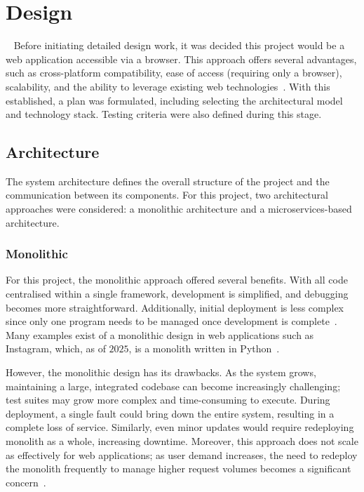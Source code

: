 \chapter{Design}~\label{cha:design}
Before initiating detailed design work, it was decided this project would be a web application accessible via a browser. This approach offers several advantages, such as cross-platform compatibility, ease of access (requiring only a browser), scalability, and the ability to leverage existing web technologies~\cite{6822300}. With this established, a plan was formulated, including selecting the architectural model and technology stack. Testing criteria were also defined during this stage.

\section{Architecture}
The system architecture defines the overall structure of the project and the communication between its components. For this project, two architectural approaches were considered: a monolithic architecture and a microservices-based architecture.

\subsection{Monolithic}
For this project, the monolithic approach offered several benefits. With all code centralised within a single framework, development is simplified, and debugging becomes more straightforward. Additionally, initial deployment is less complex since only one program needs to be managed once development is complete~\cite{9109514}. Many examples exist of a monolithic design in web applications such as Instagram, which, as of $2025$, is a monolith written in Python~\cite{InstagramMonolith}.

However, the monolithic design has its drawbacks. As the system grows, maintaining a large, integrated codebase can become increasingly challenging; test suites may grow more complex and time-consuming to execute. During deployment, a single fault could bring down the entire system, resulting in a complete loss of service. Similarly, even minor updates would require redeploying monolith as a whole, increasing downtime. Moreover, this approach does not scale as effectively for web applications; as user demand increases, the need to redeploy the monolith frequently to manage higher request volumes becomes a significant concern~\cite{9109514}.


